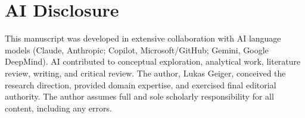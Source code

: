 \documentclass[12pt,a4paper]{article}
\theoremstyle{definition}
\theoremstyle{remark}
\begin{document}
\section*{AI Disclosure}

This manuscript was developed in extensive collaboration with AI language
models (Claude, Anthropic; Copilot, Microsoft/GitHub; Gemini, Google
DeepMind). AI contributed to conceptual exploration, analytical work,
literature review, writing, and critical review. The author, Lukas
Geiger, conceived the research direction, provided domain expertise, and
exercised final editorial authority. The author assumes full and sole
scholarly responsibility for all content, including any errors.




\end{document}
